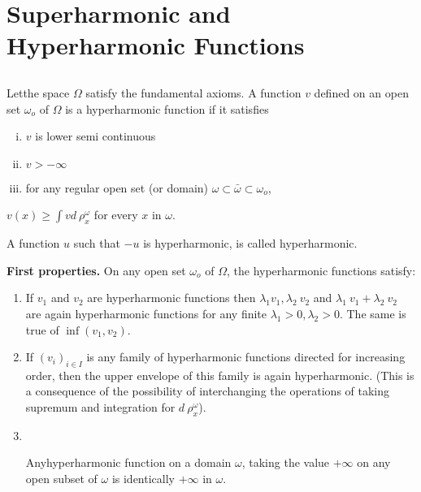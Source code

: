 \chapter{Superharmonic and Hyperharmonic Functions}\label{p4:chap2}%

\setcounter{section}{5}
\section{}\label{p4:chap2:sec6}%

\begin{defn}\label{p4:chap2:sec6:def4} %
  Let\pageoriginale the space $\Omega$ satisfy the fundamental axioms. A function
  $v$ defined on an open set $\omega_o$ of $\Omega$ is a hyperharmonic
  function if it satisfies 
  \begin{enumerate}[(i)]
  \item $v$ is lower semi continuous
  \item $v > - \infty$
  \item for any regular open set (or domain) $ \omega \subset
    \bar{\omega} \subset \omega_o$,  
  \end{enumerate}
  $v(x) \ge \int vd ~ \rho^\omega_x$ for every $x$ in $\omega$.
\end{defn}

A function $u$ such that $-u$ is hyperharmonic, is called hyperharmonic.

\textbf{First properties.} On any open set $\omega_o$ of $\Omega$, the
hyperharmonic functions satisfy: 
\begin{enumerate}[(1)]
\item If $v_1$ and $v_2$ are hyperharmonic functions then $\lambda_1
  v_1, \lambda_2 ~ v_2$ and $\lambda_1 ~ v_1 + \lambda_2 ~ v_2$ are
  again hyperharmonic functions for any finite $\lambda_1 > 0,
  \lambda_2 > 0$. The same is true of $\inf (v_1,v_2)$. 
\item If $(v_i)_{i \in I}$ is any family of hyperharmonic functions
  directed for increasing order, then the upper envelope of this
  family is again hyperharmonic. (This is a consequence of the
  possibility of interchanging the operations of taking supremum and
  integration for $d ~ \rho^\omega_x$). 
\item~
\begin{thm}\label{p4:chap2:sec6:thm2}%
  Any\pageoriginale hyperharmonic function on a domain $\omega$,
  taking the value $+ \infty$ on any open subset of $\omega$ is
  identically $+ \infty$ in $\omega$.  
\end{thm}
\end{enumerate}

